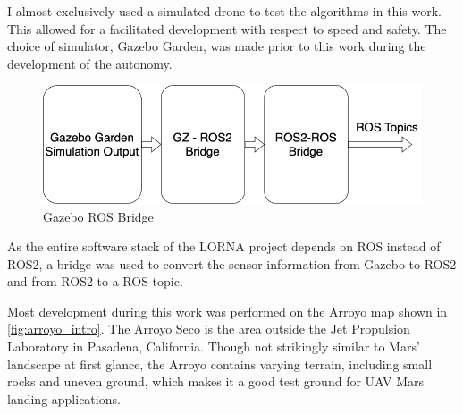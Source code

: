 \documentclass{article}
\begin{document}
I almost exclusively used a simulated drone to test the algorithms in this work. This allowed for a facilitated development with respect to speed and safety. The choice of simulator, Gazebo Garden, was made prior to this work during the development of the autonomy.

\begin{figure}[ht!]
    \centering
    \includegraphics[scale=0.45]{images/system_overview/GZ_flowchart.png}
    \caption{Gazebo ROS Bridge}
\end{figure}


As the entire software stack of the LORNA project depends on ROS instead of ROS2, a bridge was used to convert the sensor information from Gazebo to ROS2 and from ROS2 to a ROS topic.

Most development during this work was performed on the Arroyo map shown in \cref{fig:arroyo_intro}. The Arroyo Seco is the area outside the Jet Propulsion Laboratory in Pasadena, California. Though not strikingly similar to Mars' landscape at first glance, the Arroyo contains varying terrain, including small rocks and uneven ground, which makes it a good test ground for UAV Mars landing applications.
\end{document}
